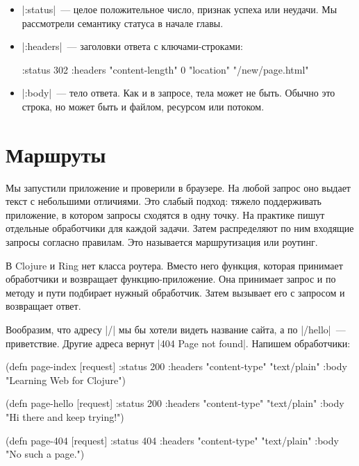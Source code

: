 \begin{itemize}

\item
  \spverb|:status|~--- целое положительное число, признак успеха или неудачи. Мы
  рассмотрели семантику статуса в начале главы.

\item
  \spverb|:headers|~--- заголовки ответа с ключами-строками:

\begin{english}
  \begin{clojure}
{:status 302
 :headers {"content-length" 0
           "location" "/new/page.html"}}
  \end{clojure}
\end{english}

\item
  \spverb|:body|~--- тело ответа. Как и в запросе, тела может не быть. Обычно
  это строка, но может быть и файлом, ресурсом или потоком.

\end{itemize}

\section{Маршруты}

Мы запустили приложение и проверили в браузере. На любой запрос оно выдает текст
с небольшими отличиями. Это слабый подход: тяжело поддерживать приложение, в
котором запросы сходятся в одну точку. На практике пишут отдельные обработчики
для каждой задачи. Затем распределяют по ним входящие запросы согласно
правилам. Это называется маршрутизация или роутинг.

В Clojure и Ring нет класса роутера. Вместо него функция, которая принимает
обработчики и возвращает функцию-приложение. Она принимает запрос и по методу и
пути подбирает нужный обработчик. Затем вызывает его с запросом и возвращает
ответ.

Вообразим, что адресу \spverb|/| мы бы хотели видеть название сайта, а по
\spverb|/hello|~--- приветствие. Другие адреса вернут \spverb|404 Page not found|.
Напишем обработчики:

\begin{english}
  \begin{clojure}
(defn page-index [request]
  {:status 200
   :headers {"content-type" "text/plain"}
   :body "Learning Web for Clojure"})

(defn page-hello [request]
  {:status 200
   :headers {"content-type" "text/plain"}
   :body "Hi there and keep trying!"})

(defn page-404 [request]
  {:status 404
   :headers {"content-type" "text/plain"}
   :body "No such a page."})
  \end{clojure}
\end{english}

